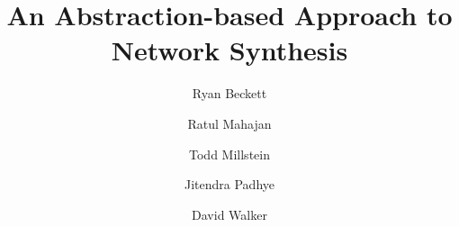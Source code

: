 \documentclass{sig-alternate-10pt}
\begin{document}

\setlength{\pdfpageheight}{\paperheight}
\setlength{\pdfpagewidth}{\paperwidth}

\title{An Abstraction-based Approach to Network Synthesis}



\author{%
Ryan Beckett\\
\and
Ratul Mahajan\\
\and
Todd Millstein\\
\and
Jitendra Padhye\\
\and
David Walker\\
}

\maketitle


%
%
%
%


%
%
%
%
%
\end{document}
